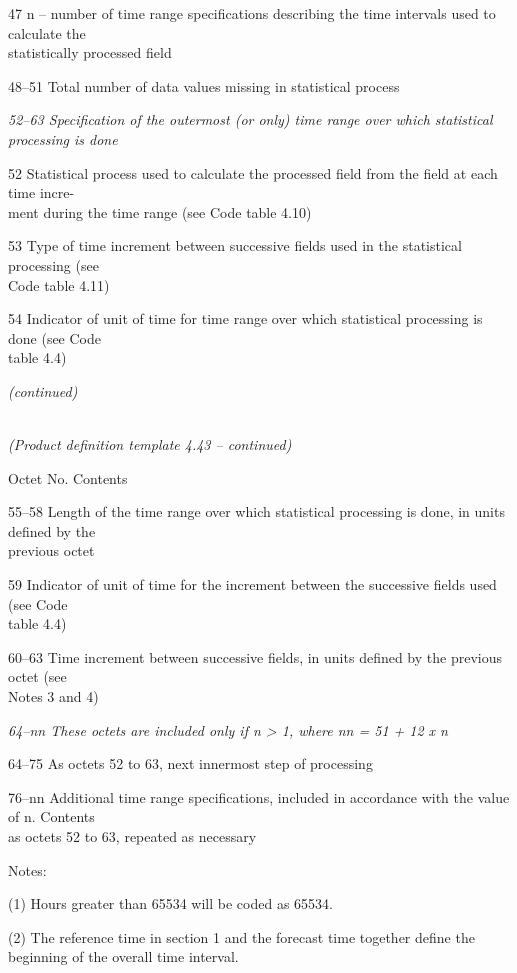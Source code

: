 47 n -- number of time range specifications describing the time intervals used to calculate the\\
statistically processed field

48--51 Total number of data values missing in statistical process

\emph{52--63 Specification of the outermost (or only) time range over which statistical}\\
\emph{processing is done}

52 Statistical process used to calculate the processed field from the field at each time incre-\\
ment during the time range (see Code table 4.10)

53 Type of time increment between successive fields used in the statistical processing (see\\
Code table 4.11)

54 Indicator of unit of time for time range over which statistical processing is done (see Code\\
table 4.4)

\emph{(continued)}

\emph{\\
(Product definition template 4.43 -- continued)}

Octet No. Contents

55--58 Length of the time range over which statistical processing is done, in units defined by the\\
previous octet

59 Indicator of unit of time for the increment between the successive fields used (see Code\\
table 4.4)

60--63 Time increment between successive fields, in units defined by the previous octet (see\\
Notes 3 and 4)

\emph{64--nn These octets are included only if n \textgreater{} 1, where nn = 51 + 12 x n}

64--75 As octets 52 to 63, next innermost step of processing

76--nn Additional time range specifications, included in accordance with the value of n. Contents\\
as octets 52 to 63, repeated as necessary

Notes:

(1) Hours greater than 65534 will be coded as 65534.

(2) The reference time in section 1 and the forecast time together define the beginning of the overall time interval.

